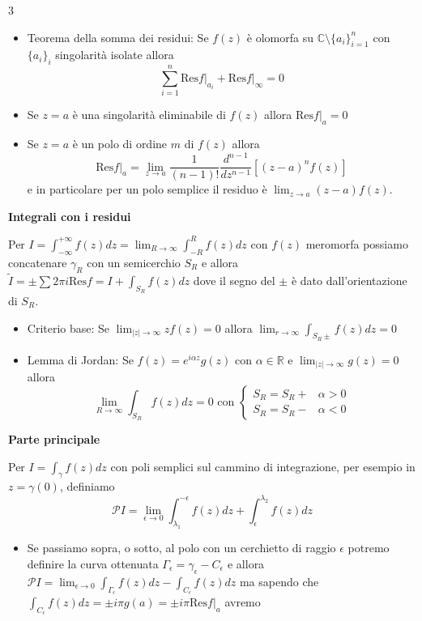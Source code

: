 \documentclass[10pt,a4paper]{report}
\begin{document}
\begin{multicols*}{3}
\begin{center}
\begin{itemize}[label=$\cdot$]
		\item Teorema della somma dei residui: Se $f(z)$ è olomorfa su $\mathbb{C}\setminus\{a_i\}_{i=1}^n$ con $\{a_i\}_i$ singolarità isolate allora
		\[
		 \sum_{i=1}^n \left.\text{Res}f\right|_{a_i} + \left.\text{Res}f\right|_{\infty}=0
		\]
		\item Se $z=a$ è una singolarità eliminabile di $f(z)$ allora $\left.\text{Res}f\right|_{a}=0$
		\item Se $z=a$ è un polo di ordine $m$ di $f(z)$ allora \[\left.\text{Res}f\right|_{a}=\lim_{z\rightarrow a} \dfrac{1}{(n-1)!} \dfrac{d^{n-1}}{dz^{n-1}} \left[ (z-a)^n f(z) \right]\] 
		e in particolare per un polo semplice il residuo è $\lim_{z\rightarrow a} (z-a)f(z)$.
	\end{itemize}
\textbf{Integrali con i residui} \par
Per $I=\int_{-\infty}^{+\infty} f(z) dz=\lim_{R\rightarrow \infty}\int_{-R}^R f(z) dz$ con $f(z)$ meromorfa possiamo concatenare $\gamma_R$ con un semicerchio $S_R$ e allora $\tilde{I}=\pm\sum 2\pi i \text{Res} f= I +\int_{S_R} f(z)dz$ dove il segno del $\pm$ è dato dall'orientazione di $S_R$.
	\begin{itemize}[label=$\cdot$]
		\item Criterio base: Se $\lim_{|z|\rightarrow\infty} zf(z)=0$ allora $\lim_{r\rightarrow\infty} \int_{S_R\pm} f(z)dz=0$
		\item Lemma di Jordan: Se $f(z)=e^{i\alpha z} g(z)$ con $\alpha\in\mathbb{R}$ e $\lim_{|z|\rightarrow\infty} g(z)=0$ allora 
		\[
		\lim_{R\rightarrow\infty}\int_{S_R} f(z)dz=0 \text{ con }\begin{cases} S_R=S_R+ &\alpha>0 \\ S_R=S_R- &\alpha<0 \end{cases}
		\]
	\end{itemize}
\par
\textbf{Parte principale} \par
Per $I=\int_\gamma f(z)dz$ con poli semplici sul cammino di integrazione, per esempio in $z=\gamma(0)$, definiamo \[\mathcal{P} I=\lim_{\epsilon\rightarrow0}\int_{\lambda_1}^{-\epsilon} f(z)dz + \int_{\epsilon}^{\lambda_2} f(z)dz \]
	\begin{itemize}[label=$\cdot$]
		\item Se passiamo sopra, o sotto, al polo con un cerchietto di raggio $\epsilon$ potremo definire la curva ottenuata $\Gamma_\epsilon=\gamma_\epsilon-C_\epsilon$ e allora $\mathcal{P}I=\lim_{\epsilon\rightarrow 0} \int_{\Gamma_{\epsilon}}f(z)dz-\int_{C_{\epsilon}}f(z)dz$ ma sapendo che $\int_{C_\epsilon} f(z)dz=\pm i\pi g(a)=\pm i\pi \left.\text{Res}f\right|_{a}$ avremo

\end{itemize}
\end{center}
\end{multicols*}
\end{document}
